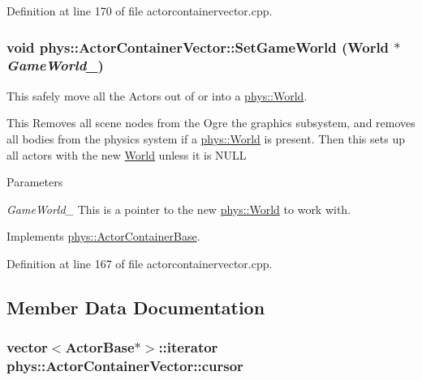 Definition at line 170 of file actorcontainervector.cpp.

\hypertarget{classphys_1_1ActorContainerVector_ab4c1394254057465f7a2f89b87dc49aa}{
\subsubsection[{SetGameWorld}]{\setlength{\rightskip}{0pt plus 5cm}void phys::ActorContainerVector::SetGameWorld ({\bf World} $\ast$ {\em GameWorld\_\-})}}
\label{d3/d64/classphys_1_1ActorContainerVector_ab4c1394254057465f7a2f89b87dc49aa}


This safely move all the Actors out of or into a \hyperlink{classphys_1_1World}{phys::World}. 

This Removes all scene nodes from the Ogre the graphics subsystem, and removes all bodies from the physics system if a \hyperlink{classphys_1_1World}{phys::World} is present. Then this sets up all actors with the new \hyperlink{classphys_1_1World}{World} unless it is NULL 
\begin{DoxyParams}{Parameters}
\item[{\em GameWorld\_\-}]This is a pointer to the new \hyperlink{classphys_1_1World}{phys::World} to work with. \end{DoxyParams}


Implements \hyperlink{classphys_1_1ActorContainerBase_ae0cb5c288f17507247dd98d3a2466876}{phys::ActorContainerBase}.



Definition at line 167 of file actorcontainervector.cpp.



\subsection{Member Data Documentation}
\hypertarget{classphys_1_1ActorContainerVector_a08bdad9b15e265b5d44470f21766b6ed}{
\subsubsection[{cursor}]{\setlength{\rightskip}{0pt plus 5cm}vector$<${\bf ActorBase}$\ast$$>$::iterator {\bf phys::ActorContainerVector::cursor}}}
\label{d3/d64/classphys_1_1ActorContainerVector_a08bdad9b15e265b5d44470f21766b6ed}


